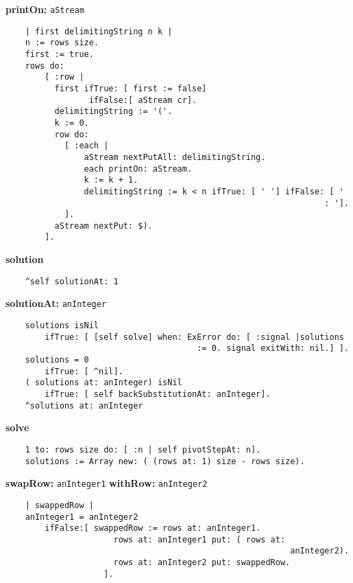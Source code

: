 {\bf printOn:} {\tt aStream}
\begin{verbatim}
    | first delimitingString n k |
    n := rows size.
    first := true.
    rows do:
        [ :row |
          first ifTrue: [ first := false]
                 ifFalse:[ aStream cr].
          delimitingString := '('.
          k := 0.
          row do:
            [ :each |
                aStream nextPutAll: delimitingString.
                each printOn: aStream.
                k := k + 1.
                delimitingString := k < n ifTrue: [ ' '] ifFalse: [ ' 
                                                                 : '].
            ].
          aStream nextPut: $).
        ].

\end{verbatim}
{\bf solution}
\begin{verbatim}
    ^self solutionAt: 1

\end{verbatim}
{\bf solutionAt:} {\tt anInteger}
\begin{verbatim}
    solutions isNil
        ifTrue: [ [self solve] when: ExError do: [ :signal |solutions 
                                       := 0. signal exitWith: nil.] ].
    solutions = 0
        ifTrue: [ ^nil].
    ( solutions at: anInteger) isNil
        ifTrue: [ self backSubstitutionAt: anInteger].
    ^solutions at: anInteger

\end{verbatim}
{\bf solve}
\begin{verbatim}
    1 to: rows size do: [ :n | self pivotStepAt: n].
    solutions := Array new: ( (rows at: 1) size - rows size).

\end{verbatim}
{\bf swapRow:} {\tt anInteger1} {\bf withRow:} {\tt anInteger2}
\begin{verbatim}
    | swappedRow |
    anInteger1 = anInteger2
        ifFalse:[ swappedRow := rows at: anInteger1.
                      rows at: anInteger1 put: ( rows at: 
                                                          anInteger2).
                      rows at: anInteger2 put: swappedRow.
                    ].

\end{verbatim}

